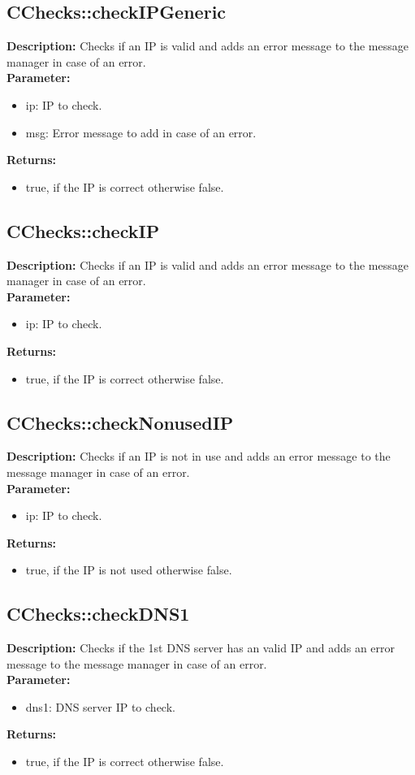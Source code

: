 \subsection{CChecks::checkIPGeneric}
\textbf{Description:} Checks if an IP is valid and adds an error message to the message manager in case of an error.\\
\textbf{Parameter:}
\begin{itemize}
\item ip: IP to check.
\item msg: Error message to add in case of an error.
\end{itemize}
\textbf{Returns:}
\begin{itemize}
\item true, if the IP is correct otherwise false.
\end{itemize}

\subsection{CChecks::checkIP}
\textbf{Description:} Checks if an IP is valid and adds an error message to the message manager in case of an error.\\
\textbf{Parameter:}
\begin{itemize}
\item ip: IP to check.
\end{itemize}
\textbf{Returns:}
\begin{itemize}
\item true, if the IP is correct otherwise false.
\end{itemize}

\subsection{CChecks::checkNonusedIP}
\textbf{Description:} Checks if an IP is not in use and adds an error message to the message manager in case of an error.\\
\textbf{Parameter:}
\begin{itemize}
\item ip: IP to check.
\end{itemize}
\textbf{Returns:}
\begin{itemize}
\item true, if the IP is not used otherwise false.
\end{itemize}

\subsection{CChecks::checkDNS1}
\textbf{Description:} Checks if the 1st DNS server has an valid IP and adds an error message to the message manager in case of an error.\\
\textbf{Parameter:}
\begin{itemize}
\item dns1: DNS server IP to check.
\end{itemize}
\textbf{Returns:}
\begin{itemize}
\item true, if the IP is correct otherwise false.
\end{itemize}

